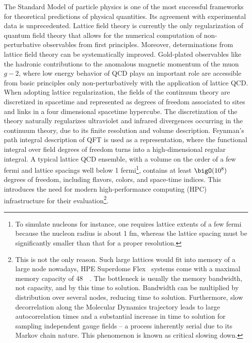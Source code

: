 The Standard Model of particle physics is one of the most successful frameworks for theoretical predictions of physical quantities.
Its agreement with experimental data is unprecedented.
Lattice field theory is currently the only regularization of quantum field theory that allows for the numerical computation of non-perturbative observables from first principles.
Moreover, determinations from lattice field theory can be systematically improved.
Gold-plated observables like the hadronic contributions to the anomalous magnetic momentum of the muon $g-2$, where low energy behavior of QCD plays an important role are accessible from basic principles only non-perturbatively with the application of lattice QCD.
When adopting lattice regularization, the fields of the continuum theory are discretized in spacetime and represented as degrees of freedom associated to sites and links in a four dimensional spacetime hypercube.
The discretization of the theory naturally regularizes ultraviolet and infrared divergences occurring in the continuum theory, due to its finite resolution and volume description.
Feynman's path integral description of QFT is used as a representation, where the functional integral over field degrees of freedom turns into a high-dimensional regular integral.
A typical lattice QCD ensemble, with a volume on the order of a few fermi and lattice spacings well below \num{1} fermi\footnote{To simulate nucleons for instance, one requires lattice extents of a few fermi because the nucleon radius is about \num{1} fm, whereas the lattice spacing must be significantly smaller than that for a proper resolution.}, contains at least $\bigO(10^8)$ degrees of freedom, including flavors, colors, and space-time indices.
This introduces the need for modern high-performance computing (HPC) infrastructure for their evaluation\footnote{
This is not the only reason.
Such large lattices would fit into memory of a large node nowadays, \eg HPE Superdome Flex~\cite{online:superdome} systems come with a maximal memory capacity of \SI{48}{\tera \byte}.
The bottleneck is usually the memory bandwidth, not capacity, and by this time to solution.
Bandwidth can be multiplied by distribution over several nodes, reducing time to solution.
Furthermore, slow decorrelation along the Molecular Dynamics trajectory leads to large autocorrelation times and a substantial increase in time to solution for sampling independent gauge fields -- a process inherently serial due to its Markov chain nature.
This phenomenon is known as critical slowing down.
}.
